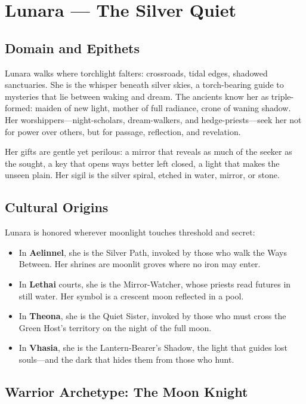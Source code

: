 \section{Lunara — The Silver Quiet}

\subsection{Domain and Epithets}

Lunara walks where torchlight falters: crossroads, tidal edges, shadowed sanctuaries. She is the whisper beneath silver skies, a torch-bearing guide to mysteries that lie between waking and dream. The ancients know her as triple-formed: maiden of new light, mother of full radiance, crone of waning shadow. Her worshippers—night-scholars, dream-walkers, and hedge-priests—seek her not for power over others, but for passage, reflection, and revelation.

Her gifts are gentle yet perilous: a mirror that reveals as much of the seeker as the sought, a key that opens ways better left closed, a light that makes the unseen plain. Her sigil is the silver spiral, etched in water, mirror, or stone.

\subsection{Cultural Origins}

Lunara is honored wherever moonlight touches threshold and secret:

\begin{itemize}
\item In \textbf{Aelinnel}, she is the Silver Path, invoked by those who walk the Ways Between. Her shrines are moonlit groves where no iron may enter.
\item In \textbf{Lethai} courts, she is the Mirror-Watcher, whose priests read futures in still water. Her symbol is a crescent moon reflected in a pool.
\item In \textbf{Theona}, she is the Quiet Sister, invoked by those who must cross the Green Host's territory on the night of the full moon.
\item In \textbf{Vhasia}, she is the Lantern-Bearer's Shadow, the light that guides lost souls—and the dark that hides them from those who hunt.
\end{itemize}

\subsection{Warrior Archetype: The Moon Knight}


